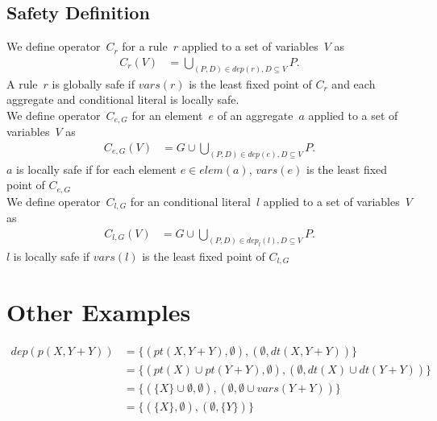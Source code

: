 \documentclass{article}
\newcommand{\set}[1]{\{#1\}}
\newcommand{\dep}[2]{\{(#1), (#2)\}}
\newcommand\Vars[1]{\mathit{vars}(#1)}
\newcommand\DP[1]{\mathit{dep}(#1)}
\newcommand\CheckOp[1]{C_{#1}}
\newcommand\CheckAp[2]{\CheckOp{#1}({#2})}
\begin{document}
	\subsection{Safety Definition}
	We define operator~$\CheckOp{r}$ for a rule~$r$ applied to a set of variables~$V$ as
	\begin{align*}
	\CheckAp{r}{V} &= \bigcup_{(P,D) \in \DP{r}, D \subseteq V} P.
	\end{align*}
	A rule~$r$ is globally safe if $\Vars{r}$ is the least fixed point of $\CheckOp{r}$ and each aggregate and conditional literal is locally safe.
	\\
	We define operator~$\CheckOp{e,G}$ for an element~$e$ of an aggregate~$a$ applied to a set of variables~$V$ as
	\begin{align*}
		\CheckAp{e,G}{V} &= G \cup \bigcup_{(P,D) \in \DP{e}, D \subseteq V} P.
	\end{align*}
	$a$ is locally safe if for each element $e \in elem(a)$, $\Vars{e}$ is the least fixed point of $\CheckOp{e,G}$
	\\
	We define operator~$\CheckOp{l,G}$ for an conditional literal~$l$ applied to a set of variables~$V$ as
	\begin{align*}
		\CheckAp{l,G}{V} &= G \cup \bigcup_{(P,D) \in dep_l(l), D \subseteq V} P.
	\end{align*}
	$l$ is locally safe if $\Vars{l}$ is the least fixed point of $\CheckOp{l,G}$
	\section{Other Examples}
	\begin{align*}
		dep(p(X,Y+Y)) &= \dep{pt(X,Y+Y), \emptyset}{\emptyset, dt(X,Y+Y)}
		\\ &= \dep{pt(X) \cup pt(Y+Y), \emptyset}{\emptyset, dt(X) \cup dt(Y+Y)}
		\\ &= \dep{\set{X} \cup \emptyset, \emptyset}{\emptyset, \emptyset \cup vars(Y+Y)}
		\\ &= \dep{\set{X}, \emptyset}{\emptyset, \set{Y}}
	\end{align*}
\end{document}
